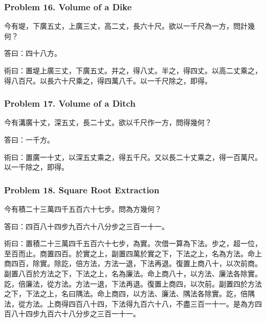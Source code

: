 \documentclass[11pt,a4paper]{article}
\newcommand{\zh}[1]{{\CJKfamily{}#1}}
\begin{document}
\subsubsection*{Problem 16. Volume of a Dike}

\begin{problembox}[title=\zh{問}]
\zh{今有堤，下廣五丈，上廣三丈，高二丈，長六十尺。欲以一千尺為一方，問計幾何？}
\end{problembox}
\begin{answerbox}[title=\zh{答}]
\zh{答曰：四十八方。}
\end{answerbox}
\begin{methodbox}[title=\zh{術}]
\zh{術曰：置堤上廣三丈，下廣五丈。并之，得八丈。半之，得四丈。以高二丈乘之，得八百尺。以長六十尺乘之，得四萬八千。以一千尺除之，即得。}
\end{methodbox}

\subsubsection*{Problem 17. Volume of a Ditch}

\begin{problembox}[title=\zh{問}]
\zh{今有溝廣十丈，深五丈，長二十丈。欲以千尺作一方，問得幾何？}
\end{problembox}
\begin{answerbox}[title=\zh{答}]
\zh{答曰：一千方。}
\end{answerbox}
\begin{methodbox}[title=\zh{術}]
\zh{術曰：置廣一十丈，以深五丈乘之，得五千尺。又以長二十丈乘之，得一百萬尺。以一千除之，即得。}
\end{methodbox}

\subsubsection*{Problem 18. Square Root Extraction}

\begin{problembox}[title=\zh{問}]
\zh{今有積二十三萬四千五百六十七步。問為方幾何？}
\end{problembox}
\begin{answerbox}[title=\zh{答}]
\zh{答曰：四百八十四步九百六十八分步之三百一十一。}
\end{answerbox}
\begin{methodbox}[title=\zh{術}]
\zh{術曰：置積二十三萬四千五百六十七步，為實。次借一算為下法。步之，超一位，至百而止。商置四百。於實之上，副置四萬於實之下，下法之上，名為方法。命上商四百，除實。除訖，倍方法，方法一退，下法再退。復置上商八十，以次前商。副置八百於方法之下，下法之上，名為廉法。命上商八十，以方法、廉法各除實。訖，倍廉法，從方法。方法一退，下法再退。復置上商四，以次前。副置四於方法之下，下法之上，名曰隅法。命上商四，以方法、廉法、隅法各除實。訖，倍隅法，從方法。上商得四百八十四，下法得九百六十八，不盡三百一十一。是為方四百八十四步九百六十八分步之三百一十一。}
\end{methodbox}
\end{document}
